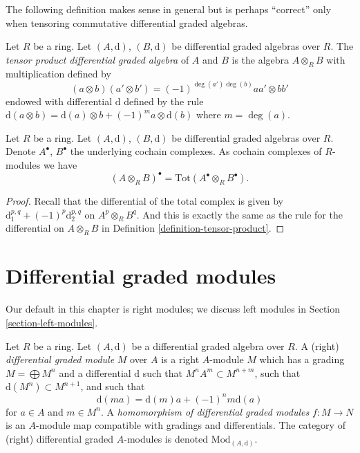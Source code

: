 \noindent
The following definition makes sense in general but is perhaps
``correct'' only when tensoring commutative differential graded
algebras.

\begin{definition}
\label{definition-tensor-product}
Let $R$ be a ring.
Let $(A, \text{d})$, $(B, \text{d})$ be differential graded algebras over $R$.
The {\it tensor product differential graded algebra} of $A$ and $B$
is the algebra $A \otimes_R B$ with multiplication defined by
$$
(a \otimes b)(a' \otimes b') = (-1)^{\deg(a')\deg(b)} aa' \otimes bb'
$$
endowed with differential $\text{d}$ defined by the rule
$\text{d}(a \otimes b) = \text{d}(a) \otimes b + (-1)^m a \otimes \text{d}(b)$
where $m = \deg(a)$.
\end{definition}

\begin{lemma}
\label{lemma-total-complex-tensor-product}
Let $R$ be a ring.
Let $(A, \text{d})$, $(B, \text{d})$ be differential graded algebras over $R$.
Denote $A^\bullet$, $B^\bullet$ the underlying cochain complexes.
As cochain complexes of $R$-modules we have
$$
(A \otimes_R B)^\bullet = \text{Tot}(A^\bullet \otimes_R B^\bullet).
$$
\end{lemma}

\begin{proof}
Recall that the differential of the total complex is given by
$\text{d}_1^{p, q} + (-1)^p \text{d}_2^{p, q}$ on $A^p \otimes_R B^q$.
And this is exactly the same as the rule for the differential
on $A \otimes_R B$ in
Definition \ref{definition-tensor-product}.
\end{proof}






\section{Differential graded modules}
\label{section-modules}

\noindent
Our default in this chapter is right modules;
we discuss left modules in Section \ref{section-left-modules}.

\begin{definition}
\label{definition-dgm}
Let $R$ be a ring.
Let $(A, \text{d})$ be a differential graded algebra over $R$.
A (right) {\it differential graded module} $M$ over $A$ is a right $A$-module
$M$ which has a grading $M = \bigoplus M^n$ and a differential $\text{d}$
such that $M^n A^m \subset M^{n + m}$, such that
$\text{d}(M^n) \subset M^{n + 1}$, and such that
$$
\text{d}(ma) = \text{d}(m)a + (-1)^n m\text{d}(a)
$$
for $a \in A$ and $m \in M^n$. A
{\it homomorphism of differential graded modules} $f : M \to N$
is an $A$-module map compatible with gradings and differentials.
The category of (right) differential graded $A$-modules is denoted
$\text{Mod}_{(A, \text{d})}$.
\end{definition}

